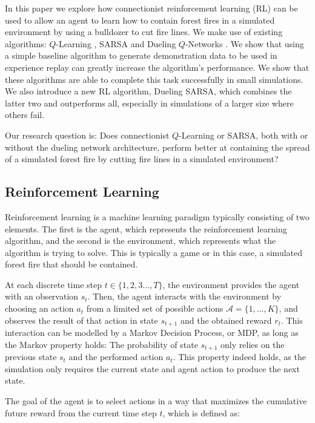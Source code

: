 In this paper we explore how connectionist reinforcement learning (RL) can be used to allow an agent to learn how to contain forest fires in a simulated environment by using a bulldozer to cut fire lines. We make use of existing algorithms: $Q$-Learning \citep{watkins1989learning}, SARSA \citep{rummery1994line} and Dueling $Q$-Networks \citep{wang2015dueling}. We show that using a simple baseline algorithm to generate demonstration data to be used in experience replay can greatly increase the algorithm's performance. We show that these algorithms are able to complete this task successfully in small simulations. We also introduce a new RL algorithm, Dueling SARSA, which combines the latter two and outperforms all, especially in simulations of a larger size where others fail.

Our research question is: Does connectionist $Q$-Learning or SARSA, both with or without the dueling network architecture, perform better at containing the spread of a simulated forest fire by cutting fire lines in a simulated environment?

\subsection{Reinforcement Learning}\label{sec:reinforcementlearning}
Reinforcement learning is a machine learning paradigm typically consisting of two elements. The first is the agent, which represents the reinforcement learning algorithm, and the second is the environment, which represents what the algorithm is trying to solve. This is typically a game or in this case, a simulated forest fire that should be contained.

At each discrete time step $t \in \{1,2,3...,T\}$, the environment provides the agent with an observation $s_t$. Then, the agent interacts with the environment by choosing an action $a_t$ from a limited set of possible actions $\mathcal{A}=\{1,...,K\}$, and observes the result of that action in state $s_{t+1}$ and the obtained reward $r_t$. This interaction can be modelled by a Markov Decision Process, or MDP, as long as the Markov property holds: The probability of state $s_{t+1}$ only relies on the previous state $s_t$ and the performed action $a_t$. This property indeed holds, as the simulation only requires the current state and agent action to produce the next state.

The goal of the agent is to select actions in a way that maximizes the cumulative future reward from the current time step $t$, which is defined as:

